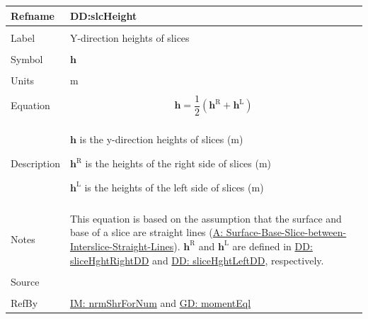 \documentclass[12pt]{article}
\begin{document}
\noindent \begin{minipage}{\textwidth}
\begin{tabular}{>{\raggedright}p{}>{\raggedright\arraybackslash}p{}}
\toprule \textbf{Refname} & \textbf{DD:slcHeight}
\label{DD:slcHeight}
\\ \midrule \\
Label & Y-direction heights of slices
\\ \midrule \\
Symbol & $\mathbf{h}$
\\ \midrule \\
Units & m
\\ \midrule \\
Equation & \begin{displaymath}
           \mathbf{h}=\frac{1}{2} \left({\mathbf{h}^{\text{R}}}+{\mathbf{h}^{\text{L}}}\right)
           \end{displaymath}
\\ \midrule \\
Description & \begin{symbDescription}
              \item{$\mathbf{h}$ is the y-direction heights of slices (m)}
              \item{${\mathbf{h}^{\text{R}}}$ is the heights of the right side of slices (m)}
              \item{${\mathbf{h}^{\text{L}}}$ is the heights of the left side of slices (m)}
              \end{symbDescription}
\\ \midrule \\
Notes & This equation is based on the assumption that the surface and base of a slice are straight lines (\hyperref[assumpSBSBISL]{A: Surface-Base-Slice-between-Interslice-Straight-Lines}).
        ${\mathbf{h}^{\text{R}}}$ and ${\mathbf{h}^{\text{L}}}$ are defined in \hyperref[DD:sliceHghtRightDD]{DD: sliceHghtRightDD} and \hyperref[DD:sliceHghtLeftDD]{DD: sliceHghtLeftDD}, respectively.
\\ \midrule \\
Source & \cite{fredlund1977}
\\ \midrule \\
RefBy & \hyperref[IM:nrmShrForNum]{IM: nrmShrForNum} and \hyperref[GD:momentEql]{GD: momentEql}
\\ \bottomrule
\end{tabular}
\end{minipage}
\par~
\end{document}
